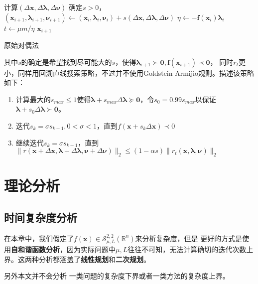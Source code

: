 \documentclass{article}
\begin{document}
\renewcommand{\algorithmcfname}{算法}
\begin{algorithm}[H]
     {
        计算$(\Delta\bm x,\Delta\bm\lambda,\Delta\bm\nu)$\;
        确定$s>0$，$(\bm x_{i+1},\bm\lambda_{i+1},\bm\nu_{i+1})\leftarrow (\bm x_i,\bm\lambda_i,\bm\nu_i)+s(\Delta\bm x,\Delta\bm \lambda,\Delta\bm \nu)$\;
        $\eta\leftarrow-\bm f(\bm x_i)\bm \lambda_i$\;
        $t\leftarrow \mu m/\eta$\;
         {
            \Return $\bm x_{i+1}$
        }

    }
    \caption{原始对偶法}
    \label{prim_dual_method}
\end{algorithm}
其中$s$的确定是希望找到尽可能大的$s$，使得$\bm \lambda_{i+1}\succ \bm 0,\bm f(\bm x_{i+1})\prec\bm 0$，
同时$r_t$更小，同样用回溯直线搜索策略，不过并不使用Goldstein-Armijio规则。描述该策略如下：
\begin{enumerate}
    \item 计算最大的$s_{max}\le 1$使得$\bm\lambda+s_{max}\Delta\bm\lambda\succeq \bm 0$，令$s_0=0.99s_{max}$以保证$\bm\lambda+s_{0}\Delta\bm\lambda\succ \bm 0$。
    \item 迭代$s_k=\sigma s_{k-1},0<\sigma<1$，直到$f(\bm x+s_k\Delta\bm x)\prec 0$
    \item 继续迭代$s_k=\sigma s_{k-1}$，直到$\|r(\bm x+\Delta\bm x,\bm\lambda+\Delta\bm\lambda,\bm\nu+\Delta\bm\nu)\|_2\le(1-\alpha s)\|r_t(\bm x,\bm\lambda,\bm\nu)\|_2$
\end{enumerate}

\section{理论分析}
\subsection{时间复杂度分析}
在本章中，我们假定了$f(\bm x)\in\mathcal{S}_{\mu,L}^{2,2}(\mathbb{R}^n)$来分析复杂度，但是
更好的方式是使用\textbf{自和谐函数分析}，因为实际问题中$\mu,L$往往不可知，无法计算确切的迭代次数上界。这两种分析都涵盖了\textbf{线性规划}和\textbf{二次规划}。

另外本文并不会分析
一类问题的复杂度下界或者一类方法的复杂度上界。
\end{document}
